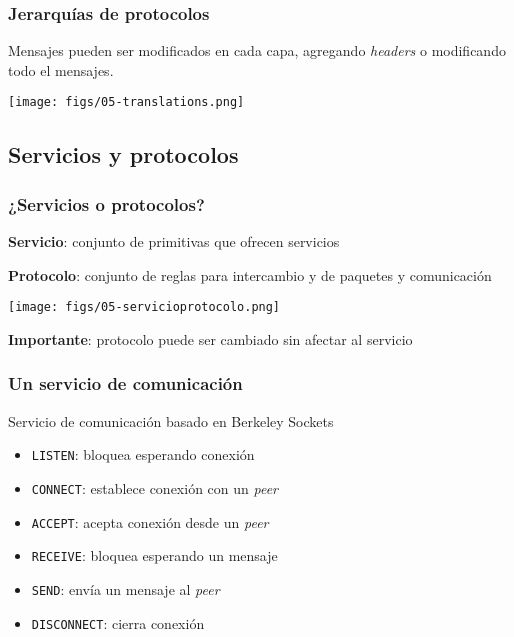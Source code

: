\documentclass[letter]{beamer}
\begin{document}
\begin{frame}
  \frametitle{Jerarquías de protocolos}
  
  Mensajes pueden ser modificados en cada capa, agregando {\em headers}
  o modificando todo el mensajes.
  
  \begin{center}
    \texttt{[image: figs/05-translations.png]}
  \end{center}

\end{frame}
\subsection{Servicios y protocolos}

\begin{frame}
  \frametitle{¿Servicios o protocolos?}

  {\bf Servicio}: conjunto de primitivas que ofrecen servicios
  
  {\bf Protocolo}: conjunto de reglas para intercambio y de paquetes y comunicación
  
  \begin{center}
    \texttt{[image: figs/05-servicioprotocolo.png]}
  \end{center}

  {\bf Importante}: protocolo puede ser cambiado sin afectar al servicio  

\end{frame}
\begin{frame}
  \frametitle{Un servicio de comunicación}
  
  Servicio de comunicación basado en Berkeley Sockets
  
  \begin{itemize}
    \item {\tt LISTEN}: bloquea esperando conexión
    \item {\tt CONNECT}: establece conexión con un {\em peer}
    \item {\tt ACCEPT}: acepta conexión desde un {\em peer}
    \item {\tt RECEIVE}: bloquea esperando un mensaje
    \item {\tt SEND}: envía un mensaje al {\em peer}
    \item {\tt DISCONNECT}: cierra conexión
  \end{itemize}
  
\end{frame}
\end{document}
